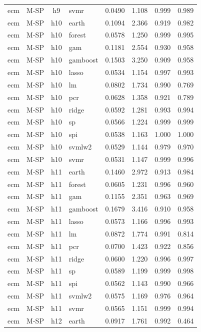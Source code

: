 \begin{ThreePartTable}
\begin{longtable}[t]{llclcccc}
ecm & M-SP & h9 & svmr & 0.0490 & 1.108 & 0.999 & 0.989\\
\addlinespace
ecm & M-SP & h10 & earth & 0.1094 & 2.366 & 0.919 & 0.982\\
ecm & M-SP & h10 & forest & 0.0578 & 1.250 & 0.999 & 0.995\\
ecm & M-SP & h10 & gam & 0.1181 & 2.554 & 0.930 & 0.958\\
ecm & M-SP & h10 & gamboost & 0.1503 & 3.250 & 0.909 & 0.958\\
ecm & M-SP & h10 & lasso & 0.0534 & 1.154 & 0.997 & 0.993\\
ecm & M-SP & h10 & lm & 0.0802 & 1.734 & 0.990 & 0.769\\
ecm & M-SP & h10 & pcr & 0.0628 & 1.358 & 0.921 & 0.789\\
ecm & M-SP & h10 & ridge & 0.0592 & 1.281 & 0.993 & 0.994\\
ecm & M-SP & h10 & sp & 0.0566 & 1.224 & 0.999 & 0.999\\
ecm & M-SP & h10 & spi & 0.0538 & 1.163 & 1.000 & 1.000\\
ecm & M-SP & h10 & svmlw2 & 0.0529 & 1.144 & 0.979 & 0.970\\
ecm & M-SP & h10 & svmr & 0.0531 & 1.147 & 0.999 & 0.996\\
\addlinespace
ecm & M-SP & h11 & earth & 0.1460 & 2.972 & 0.913 & 0.984\\
ecm & M-SP & h11 & forest & 0.0605 & 1.231 & 0.996 & 0.960\\
ecm & M-SP & h11 & gam & 0.1155 & 2.351 & 0.963 & 0.969\\
ecm & M-SP & h11 & gamboost & 0.1679 & 3.416 & 0.910 & 0.958\\
ecm & M-SP & h11 & lasso & 0.0573 & 1.166 & 0.996 & 0.993\\
ecm & M-SP & h11 & lm & 0.0872 & 1.774 & 0.991 & 0.814\\
ecm & M-SP & h11 & pcr & 0.0700 & 1.423 & 0.922 & 0.856\\
ecm & M-SP & h11 & ridge & 0.0600 & 1.220 & 0.996 & 0.997\\
ecm & M-SP & h11 & sp & 0.0589 & 1.199 & 0.999 & 0.998\\
ecm & M-SP & h11 & spi & 0.0562 & 1.143 & 0.990 & 0.966\\
ecm & M-SP & h11 & svmlw2 & 0.0575 & 1.169 & 0.976 & 0.964\\
ecm & M-SP & h11 & svmr & 0.0565 & 1.151 & 0.999 & 0.994\\
\addlinespace
ecm & M-SP & h12 & earth & 0.0917 & 1.761 & 0.992 & 0.464\\

\end{longtable}
\end{ThreePartTable}
